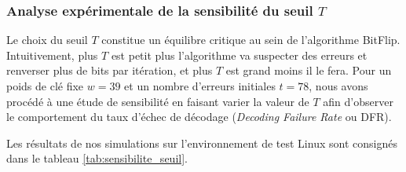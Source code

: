 \documentclass[11pt,a4paper]{article}
\begin{document}

\subsubsection{Analyse expérimentale de la sensibilité du seuil $T$}

Le choix du seuil $T$ constitue un équilibre critique au sein de
l'algorithme BitFlip.%
Intuitivement, plus $T$ est petit plus l'algorithme va suspecter des erreurs et
renverser plus de bits par itération, et plus $T$ est grand moins il le fera.
Pour un poids de clé fixe $w = 39$ et un nombre d'erreurs initiales $t = 78$,
nous avons procédé à une étude de sensibilité en faisant varier la valeur de $T$
afin d'observer le comportement du taux d'échec de décodage (\emph{Decoding
Failure Rate} ou DFR).

Les résultats de nos simulations sur l'environnement de test Linux sont
consignés dans le tableau \ref{tab:sensibilite_seuil}.
\end{document}
